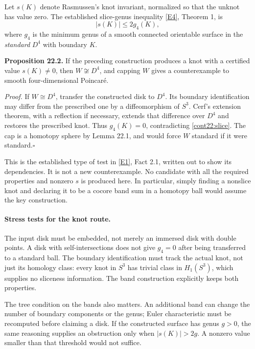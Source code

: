 \documentclass[11pt]{article}
\begin{document}
Let $s(K)$ denote Rasmussen's knot invariant, normalized so that the
unknot has value zero. The established slice-genus inequality \href{https://arxiv.org/pdf/math/0402131}{[E4]},
Theorem 1, is
\begin{equation}\label{cont22:slice}
 |s(K)|\le2g_4(K),
\end{equation}
where $g_4$ is the minimum genus of a smooth connected orientable surface
in the \emph{standard} $D^4$ with boundary $K$.

\textbf{Proposition 22.2.} If the preceding construction produces a knot
with a certified value $s(K)\ne0$, then $W\not\cong D^4$, and capping
$W$ gives a counterexample to smooth four-dimensional Poincar\'e.

\emph{Proof.} If $W\cong D^4$, transfer the constructed disk to $D^4$.
Its boundary identification may differ from the prescribed one by a
diffeomorphism of $S^3$. Cerf's extension theorem, with a reflection
if necessary, extends that difference over $D^4$ and restores the
prescribed knot. Thus $g_4(K)=0$, contradicting
\eqref{cont22:slice}. The cap is a homotopy sphere by Lemma 22.1, and
would force $W$ standard if it were standard.\hfill$\square$

This is the established type of test in \href{https://arxiv.org/pdf/0906.5177}{[E1]}, Fact 2.1, written out to
show its dependencies. It is not a new counterexample. No candidate
with all the required properties and nonzero $s$ is produced here.
In particular, simply finding a nonslice knot and declaring it to be
a cocore band sum in a homotopy ball would assume the key construction.

\paragraph{Stress tests for the knot route.}
The input disk must be embedded, not merely an immersed disk with
double points. A disk with self-intersections does not give $g_4=0$
after being transferred to a standard ball. The boundary identification
must track the actual knot, not just its homology class: every knot in
$S^3$ has trivial class in $H_1(S^3)$, which supplies no sliceness
information. The band construction explicitly keeps both properties.

The tree condition on the bands also matters. An additional band can
change the number of boundary components or the genus; Euler
characteristic must be recomputed before claiming a disk. If the
constructed surface has genus $g>0$, the same reasoning supplies an
obstruction only when $|s(K)|>2g$. A nonzero value smaller than that
threshold would not suffice.
\end{document}
